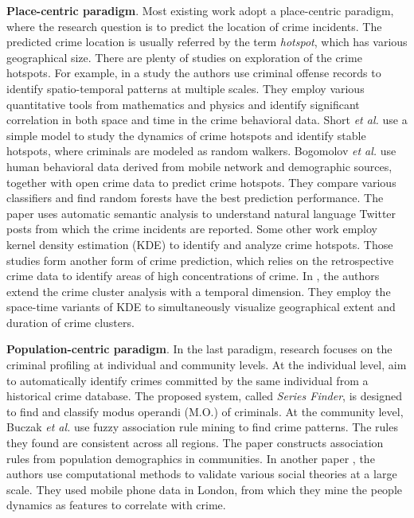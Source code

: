 \vspace{1mm}
\textbf{Place-centric paradigm}. Most existing work adopt a place-centric paradigm, where the research question is to predict the location of  crime incidents.  The predicted crime location is usually referred by the term \emph{hotspot}, which has various geographical size.  There are plenty of studies on exploration of the crime hotspots. For example, in a study \cite{TEP11} the authors  use criminal offense records to identify spatio-temporal patterns at multiple scales. They employ various quantitative tools from mathematics and physics and identify significant correlation in both space and time in the crime behavioral data.  Short \emph{et al.} \cite{SDPT+08} use a simple model to study the dynamics of crime hotspots and identify stable hotspots, where criminals are modeled as random walkers.  Bogomolov \emph{et al.} \cite{Bogo14} use human behavioral data derived from mobile network and demographic sources, together with open crime data to predict crime hotspots. They compare various classifiers and find random forests have the best prediction performance. The paper \cite{WGB12} uses automatic semantic analysis to understand natural language Twitter posts from which the crime incidents are reported. Some other work \cite{CTU08,ECCW05} employ kernel density estimation (KDE) to identify and analyze crime hotspots. Those studies form another form of crime prediction, which relies on the retrospective crime data to identify areas of high concentrations of crime. In  \cite{NaYa14}, the authors extend the crime cluster analysis with a temporal dimension. They employ the space-time variants of KDE to simultaneously visualize geographical extent and duration of crime clusters. 





\vspace{1mm}
\textbf{Population-centric paradigm}. In the last paradigm, research focuses on the criminal profiling at individual and community levels. At the individual level, \cite{WRWS13} aim to automatically  identify crimes committed by the same individual from a historical crime database. The proposed system, called \emph{Series Finder}, is designed to find and classify modus operandi (M.O.)  of criminals.  At the community level, Buczak \emph{et al.} \cite{BuGi10} use fuzzy association rule mining to find crime patterns. The rules they found are consistent across all regions. The paper constructs association rules from population demographics in communities.  In another paper \cite{TQC14}, the authors use computational methods to validate various social theories at a large scale.  They used mobile phone data in London, from which they mine the  people dynamics as features to correlate with crime.  


